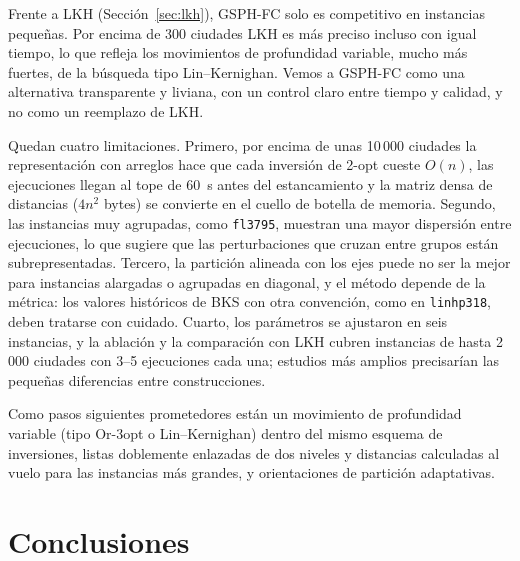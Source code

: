 \documentclass[runningheads]{llncs}
\begin{document}
Frente a LKH (Sección~\ref{sec:lkh}), GSPH-FC solo es competitivo en
instancias pequeñas. Por encima de 300 ciudades LKH es más preciso
incluso con igual tiempo, lo que refleja los movimientos de profundidad
variable, mucho más fuertes, de la búsqueda tipo Lin--Kernighan.
Vemos a GSPH-FC como una alternativa transparente y liviana, con un
control claro entre tiempo y calidad, y no como un reemplazo de LKH.

Quedan cuatro limitaciones. Primero, por encima de unas 10\,000
ciudades la representación con arreglos hace que cada inversión de 2-opt
cueste $O(n)$, las ejecuciones llegan al tope de 60~s antes del
estancamiento y la matriz densa de distancias ($4n^2$ bytes) se
convierte en el cuello de botella de memoria. Segundo, las instancias muy
agrupadas, como \texttt{fl3795}, muestran una mayor dispersión entre
ejecuciones, lo que sugiere que las perturbaciones que cruzan entre
grupos están subrepresentadas. Tercero, la partición alineada con los
ejes puede no ser la mejor para instancias alargadas o agrupadas en
diagonal, y el método depende de la métrica: los valores históricos de
BKS con otra convención, como en \texttt{linhp318}, deben tratarse con
cuidado. Cuarto, los parámetros se ajustaron en seis instancias, y la
ablación y la comparación con LKH cubren instancias de hasta 2\,000
ciudades con 3--5 ejecuciones cada una; estudios más amplios precisarían
las pequeñas diferencias entre construcciones.

Como pasos siguientes prometedores están un movimiento de profundidad
variable (tipo Or-3opt o Lin--Kernighan) dentro del mismo esquema de
inversiones, listas doblemente enlazadas de dos niveles y distancias
calculadas al vuelo para las instancias más grandes, y orientaciones de
partición adaptativas.

\section{Conclusiones}
\label{sec:conclusions}
\end{document}
